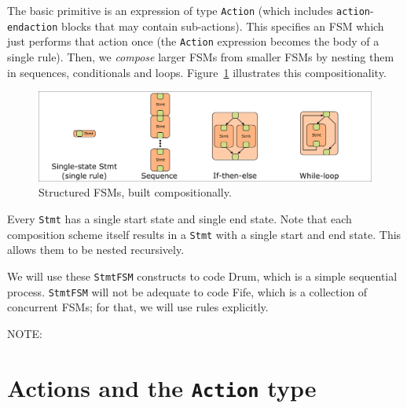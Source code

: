 The basic primitive is an expression of type \verb|Action| (which
includes {\tt action}-{\tt endaction} blocks that may contain
sub-actions).  This specifies an FSM which just performs that action
once (the {\tt Action} expression becomes the body of a single {\BSV}
rule).  Then, we \emph{compose} larger FSMs from smaller FSMs by
nesting them in sequences, conditionals and
loops. Figure~\ref{Fig_FSMs_Structured} illustrates this
compositionality.
\begin{figure}[htbp]
  \centerline{\includegraphics[width=6in,angle=0]{Figures/Fig_FSMs_Structured}}
  \caption{\label{Fig_FSMs_Structured}
           Structured FSMs, built compositionally.}
\end{figure}
Every {\tt Stmt} has a single start state and single end state.  Note
that each composition scheme itself results in a {\tt Stmt} with a
single start and end state.  This allows them to be nested
recursively.

We will use these \verb|StmtFSM| constructs to code Drum, which is a
simple sequential process.  \verb|StmtFSM| will not be adequate to
code Fife, which is a collection of concurrent FSMs; for that, we will
use rules explicitly.

\vspace{2ex}

NOTE: 


\section{Actions and the {\tt Action} type}

